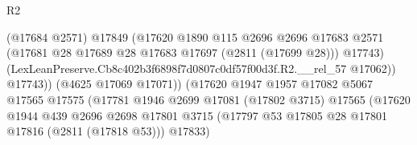 \begin{lexlean}{R2}
\begin{coremodule}
                                              (@17684 @2571)
                                              @17849
                                              (@17620
                                                @1890
                                                @115
                                                @2696
                                                @2696
                                                @17683
                                                @2571
                                                (@17681
                                                  @28
                                                  @17689
                                                  @28
                                                  @17683
                                                  @17697
                                                  (@2811 (@17699 @28)))
                                                @17743)
                                              (LexLeanPreserve.Cb8c402b3f6898f7d0807c0df57f00d3f.R2.__rel_57
                                                @17062))
                                            @17743))
                                        (@4625 @17069 @17071))
                                      (@17620
                                        @1947
                                        @1957
                                        @17082
                                        @5067
                                        @17565
                                        @17575
                                        (@17781
                                          @1946
                                          @2699
                                          @17081
                                          (@17802 @3715)
                                          @17565
                                          (@17620
                                            @1944
                                            @439
                                            @2696
                                            @2698
                                            @17801
                                            @3715
                                            (@17797
                                              @53
                                              @17805
                                              @28
                                              @17801
                                              @17816
                                              (@2811 (@17818 @53)))
                                            @17833)

\end{coremodule}
\end{lexlean}
